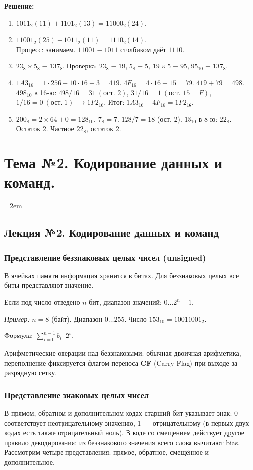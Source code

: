 \textbf{Решение:}
\begin{enumerate}
    \item[a)] $1011_2 (11) + 1101_2 (13) = 11000_2 (24).$
    \item[b)] $11001_2 (25) - 1011_2 (11) = 1110_2 (14).$\\
    Процесс: занимаем. $11001 - 1011$ столбиком даёт $1110$.
    \item[c)] $23_8 \times 5_8 = 137_8$. Проверка: $23_8=19$, $5_8=5$, $19\times5=95$, $95_{10}=137_8$.
    \item[d)] $1A3_{16} = 1\cdot256 + 10\cdot16 + 3 = 419$. $4F_{16}=4\cdot16+15=79$. $419+79=498$. $498_{10}$ в 16-ю: $498/16=31\ (\text{ост. }2)$, $31/16=1\ (\text{ост. }15=F)$, $1/16=0\ (\text{ост. }1)$ $\to 1F2_{16}$. Итог: $1A3_{16}+4F_{16}=1F2_{16}$.
    \item[e)] $200_8 = 2\times64 + 0 = 128_{10}$. $7_8=7$. $128 / 7 = 18$ (ост. 2). $18_{10}$ в 8-ю: $22_8$. Остаток 2. Частное $22_8$, остаток 2.
\end{enumerate}


\newpage
\chapter{Тема №2. Кодирование данных и команд.}
\begingroup
\emergencystretch=2em
\section{Лекция №2. Кодирование данных и команд}


\subsection{Представление беззнаковых целых чисел (unsigned)}
В ячейках памяти информация хранится в битах. Для беззнаковых целых все биты представляют значение.

Если под число отведено $n$ бит, диапазон значений: $0 \dots 2^n-1$.

\textit{Пример:} $n=8$ (байт). Диапазон $0\dots255$. Число $153_{10} = 10011001_2$.

Формула: $\sum_{i=0}^{n-1} b_i \cdot 2^i$.

Арифметические операции над беззнаковыми: обычная двоичная арифметика, переполнение фиксируется флагом переноса \textbf{CF} (Carry Flag) при выходе за разрядную сетку.

\subsection{Представление знаковых целых чисел}
В прямом, обратном и дополнительном кодах старший бит указывает знак:
0 соответствует неотрицательному значению, 1 --- отрицательному
(в первых двух кодах есть также отрицательный ноль).
В коде со смещением действует другое правило декодирования: из
беззнакового значения всего слова вычитают bias.
Рассмотрим четыре представления: прямое, обратное, смещённое и дополнительное.

